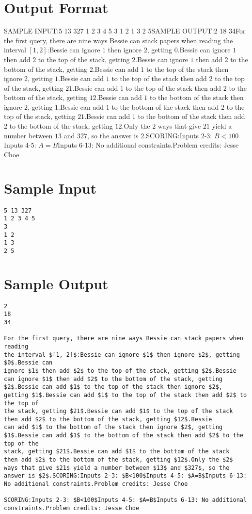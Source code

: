 \documentclass[12pt]{article}
\begin{document}
\section*{Output Format}
SAMPLE INPUT:5 13 327
1 2 3 4 5
3
1 2
1 3
2 5SAMPLE OUTPUT:2
18
34For the first query, there are nine ways Bessie can stack papers when reading
the interval $[1, 2]$:Bessie can ignore $1$ then ignore $2$, getting $0$.Bessie can
ignore $1$ then add $2$ to the top of the stack, getting $2$.Bessie
can ignore $1$ then add $2$ to the bottom of the stack, getting $2$.Bessie can add $1$ to the top of the stack then ignore $2$, getting $1$.Bessie can add $1$ to the top of the stack then add $2$ to the top of
the stack, getting $21$.Bessie can add $1$ to the top of the stack
then add $2$ to the bottom of the stack, getting $12$.Bessie
can add $1$ to the bottom of the stack then ignore $2$, getting $1$.Bessie can add $1$ to the bottom of the stack then add $2$ to the top of the
stack, getting $21$.Bessie can add $1$ to the bottom of the stack
then add $2$ to the bottom of the stack, getting $12$.Only the $2$ ways that give $21$ yield a number between $13$ and $327$, so the
answer is $2$.SCORING:Inputs 2-3: $B<100$Inputs 4-5: $A=B$Inputs 6-13: No additional constraints.Problem credits: Jesse Choe

\section*{Sample Input}
\begin{verbatim}
5 13 327
1 2 3 4 5
3
1 2
1 3
2 5
\end{verbatim}

\section*{Sample Output}
\begin{verbatim}
2
18
34

For the first query, there are nine ways Bessie can stack papers when reading
the interval $[1, 2]$:Bessie can ignore $1$ then ignore $2$, getting $0$.Bessie can
ignore $1$ then add $2$ to the top of the stack, getting $2$.Bessie
can ignore $1$ then add $2$ to the bottom of the stack, getting $2$.Bessie can add $1$ to the top of the stack then ignore $2$, getting $1$.Bessie can add $1$ to the top of the stack then add $2$ to the top of
the stack, getting $21$.Bessie can add $1$ to the top of the stack
then add $2$ to the bottom of the stack, getting $12$.Bessie
can add $1$ to the bottom of the stack then ignore $2$, getting $1$.Bessie can add $1$ to the bottom of the stack then add $2$ to the top of the
stack, getting $21$.Bessie can add $1$ to the bottom of the stack
then add $2$ to the bottom of the stack, getting $12$.Only the $2$ ways that give $21$ yield a number between $13$ and $327$, so the
answer is $2$.SCORING:Inputs 2-3: $B<100$Inputs 4-5: $A=B$Inputs 6-13: No additional constraints.Problem credits: Jesse Choe

SCORING:Inputs 2-3: $B<100$Inputs 4-5: $A=B$Inputs 6-13: No additional constraints.Problem credits: Jesse Choe
\end{verbatim}
\end{document}
